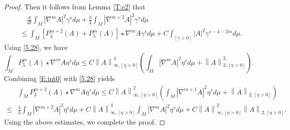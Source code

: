 \documentclass{amsart}
\theoremstyle{definition}
\numberwithin{equation}{section}
\begin{document}
\begin{proof}
Then it follows from Lemma \ref{T:e2}   that
\begin{align*}
  & \quad \frac{d}{dt} \int_{M}  \left| \nabla^{m} A \right|^{2} \gamma^{s} d\mu + \frac{3}{4} \int_{M}  \left| \nabla^{m+2} A \right|^{2}
  \gamma^{s} d\mu \\
&  \leq  \int_{M} \left[ P_{3}^{m+2}(A)+ P_{5}^{m}(A) \right] \star \nabla^{m}A \gamma^{s} d\mu  + C\int_{\left[ \gamma>0\right]} \left| A
\right|^{2} \gamma^{s-4-2m} d\mu \mbox{.}\nonumber
\end{align*}
  Using  \eqref{5.28},  we have
$$  \int_{M} P_{5}^{m}\left( A \right) \star \nabla^{m} A  \eta^{s} d\mu \leq C \left\| A \right\|_{\infty, \left[  \eta
>0\right]}^{4} \left( \int_{M} \left| \nabla^{m} A \right|^{2}  \eta^{s} d\mu + \left\| A \right\|_{2, \left[ \eta >0\right]}^{2}
\right).$$
Combining \eqref{E:int0} with \eqref{5.28} yields
\begin{align*}
  & \int_{M}  P_{3}^{m+2}\left( A \right) \star \nabla^{m} A  \eta^{s} d\mu
 \leq  C \left\| A \right\|_{\infty, \left[  \eta >0\right]}^{2}
 \left( \int_{M} \left| \nabla^{m+1} A \right|^{2}  \eta^{s} d\mu + \left\| A \right\|_{2, \left[  \eta >0\right]} \right) \\
   \leq &\frac 1 4 \int_{M} \left| \nabla^{m+2} A
\right|^{2}  \eta^{s} d\mu + C
 \left\| A \right\|_{\infty, \left[   \eta >0\right]}^{4}
 \int_{M} \left| \nabla^{m} A \right|^{2}  \eta^{s} d\mu   +  C \left\| A \right\|_{\infty, \left[  \eta >0\right]}^{2} \left\| A \right\|_{2, \left[  \eta >0\right]}
\mbox{.}
   \end{align*}
 Using the above estimates, we complete  the
  proof.  \end{proof}
\end{document}
